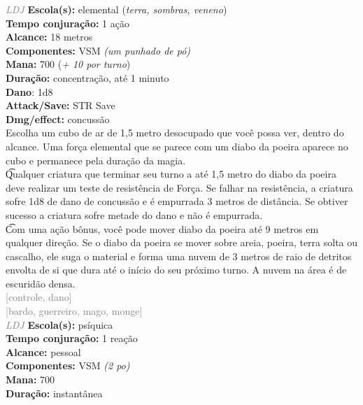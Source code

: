 \documentclass{RPG_Adventure}[2021/10/20]
\begin{document}
{\tiny \textcolor{gray}{\textit{LDJ}}}
{\small \t \textbf{Escola(s):} elemental (\textit{terra, sombras, veneno})\\\t \textbf{Tempo conjuração:} 1 ação\\\t \textbf{Alcance:} 18 metros\\\t \textbf{Componentes:} VSM \textit{(um punhado de pó)}\\\t \textbf{Mana:} 700 (\textit{+ 10 por turno})\\\t \textbf{Duração:} concentração, até 1 minuto\\\t \textbf{Dano}: 1d8\\\t \textbf{Attack/Save:} STR Save\\\t \textbf{Dmg/effect:} concussão\\}
{\normalsize Escolha um cubo de ar de 1,5 metro desocupado que você possa ver, dentro do alcance. Uma força elemental que se parece com um diabo da poeira aparece no cubo e permanece pela duração da magia.\\\t Qualquer criatura que terminar seu turno a até 1,5 metro do diabo da poeira deve realizar um teste de resistência de Força. Se falhar na resistência, a criatura sofre 1d8 de dano de concussão e é empurrada 3 metros de distância. Se obtiver sucesso a criatura sofre metade do dano e não é empurrada.\\\t Com uma ação bônus, você pode mover diabo da poeira até 9 metros em qualquer direção. Se o diabo da poeira se mover sobre areia, poeira, terra solta ou cascalho, ele suga o material e forma uma nuvem de 3 metros de raio de detritos envolta de si que dura até o início do seu próximo turno. A nuvem na área é de escuridão densa.\\}
{\scriptsize \textcolor{gray}{[controle, dano]\\}}
{\scriptsize \textcolor{gray}{[bardo, guerreiro, mago, monge]\\}}
{\tiny \textcolor{gray}{\textit{LDJ}}}
{\small \t \textbf{Escola(s):} psíquica\\\t \textbf{Tempo conjuração:} 1 reação\\\t \textbf{Alcance:} pessoal\\\t \textbf{Componentes:} VSM \textit{(2 po)}\\\t \textbf{Mana:} 700\\\t \textbf{Duração:} instantânea\\}
\end{document}
